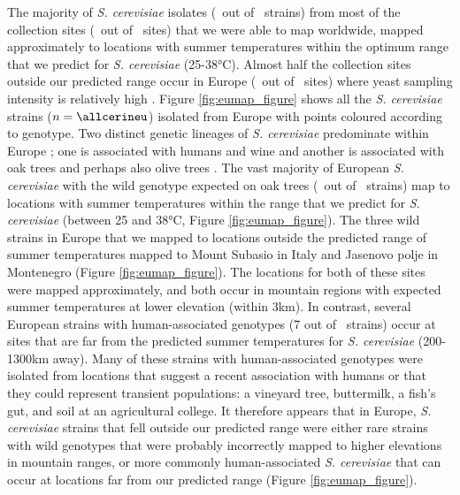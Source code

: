 \documentclass[12pt]{article}
\begin{document}
\begin{linenumbers}
The majority of \textit{S. cerevisiae} isolates (\cerok\ out of \cerinms\ strains) from most of the collection sites (\cersitesok\ out of \cersites\ sites) that we were able to map worldwide, mapped approximately to locations with summer temperatures within the optimum range that we predict for \textit{S. cerevisiae} (25-38\si{\degreeCelsius}). Almost half the collection sites outside our predicted range occur in Europe (\cereusitesnotok\ out of \cersitesnotok\ sites) where yeast sampling intensity is relatively high \citep{robert_yeast_2006,kurtzman_advances_2015}. Figure \ref{fig:eumap_figure} shows all the \textit{S. cerevisiae} strains ($n=\allcerineu$) isolated from Europe with points coloured according to genotype. Two distinct genetic lineages of \textit{S. cerevisiae} predominate within Europe \citep{cromie_genomic_2013,almeida_population_2015}; one is associated with humans and wine and another is associated with oak trees \citep{almeida_population_2015} and perhaps also olive trees \citep{cromie_genomic_2013}. The vast majority of European \textit{S. cerevisiae} with the wild genotype expected on oak trees (\cerineutmaxok\ out of \cerineu\ strains) map to locations with summer temperatures within the range that we predict for \textit{S. cerevisiae} (between 25 and 38\si{\degreeCelsius}, Figure \ref{fig:eumap_figure}). The three wild strains in Europe that we mapped to locations outside the predicted range of summer temperatures mapped to Mount Subasio in Italy and Jasenovo polje in Montenegro (Figure \ref{fig:eumap_figure}). The locations for both of these sites were mapped approximately, and both occur in mountain regions with expected summer temperatures at lower elevation (within 3km). In contrast, several European strains with human-associated genotypes (7 out of \hscerineu\ strains) occur at sites that are far from the predicted summer temperatures for \textit{S. cerevisiae} (200-1300km away). Many of these strains with human-associated genotypes were isolated from locations that suggest a recent association with humans or that they could represent transient populations: a vineyard tree, buttermilk, a fish's gut, and soil at an agricultural college. It therefore appears that in Europe, \textit{S. cerevisiae} strains that fell outside our predicted range were either rare strains with wild genotypes that were probably incorrectly mapped to higher elevations in mountain ranges, or more commonly human-associated \textit{S. cerevisiae} that can occur at locations far from our predicted range (Figure \ref{fig:eumap_figure}).


\end{linenumbers}
\end{document}
